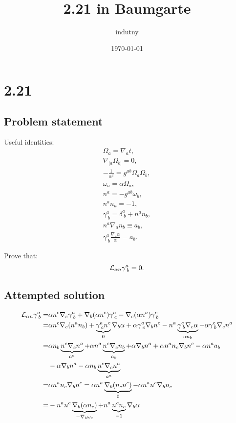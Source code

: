 \documentclass[aps,prd,preprint]{revtex4-1}
\begin{document}
\title{2.21 in Baumgarte}
\author{indutny}
\date{\today}
\noaffiliation

\maketitle

\section{2.21}

\subsection{Problem statement}

Useful identities:
\begin{align}
\Omega_a = \nabla_a t, \\
\nabla_{[a} \Omega_{b]} = 0, \\
-\frac{1}{\alpha^2} = g^{ab} \Omega_a \Omega_b, \\
\omega_a = \alpha \Omega_a, \\
n^a = -g^{ab} \omega_b, \\
n^a n_a = -1, \\
\gamma^a_{\; b} = \delta^a_{\; b} + n^a n_b, \\
n^a \nabla_a n_b \equiv a_b, \\
\gamma^a_{\; b} \frac{\nabla_a \alpha}{\alpha} = a_b.
\end{align}

Prove that:
\begin{align}
{\cal{L}}_{\alpha n} \gamma^a_{\; b} = 0.
\end{align}

\subsection{Attempted solution}

\begin{align}
{\cal{L}}_{\alpha n} \gamma^a_{\; b} = &
  \alpha n^c \nabla_c \gamma^a_{\; b} +
  \nabla_b (\alpha n^c) \gamma^a_{\; c} -
  \nabla_c (\alpha n^a) \gamma^c_{\; b} \\
= & \alpha n^c \nabla_c (n^a n_b) +
  \underbrace{\gamma^a_{\; c} n^c}_{0}  \nabla_b \alpha + \alpha \gamma^a_{\; c} \nabla_b n^c -
  n^a \underbrace{\gamma^c_{\; b} \nabla_c \alpha}_{\alpha a_b} - \alpha \gamma^c_{\; b} \nabla_c n^a \\
= & \alpha n_b \underbrace{n^c \nabla_c n^a}_{a^a} + \alpha n^a \underbrace{n^c \nabla_c n_b}_{a_b} +
  \alpha \nabla_b n^a + \alpha n^a n_c \nabla_b n^c -   \alpha n^a a_b \\
& - \alpha \nabla_b n^a - \alpha n_b \underbrace{n^c \nabla_c n^a}_{a^a} \\
= & \alpha n^a n_c \nabla_b n^c = \alpha n^a \underbrace{ \nabla_b ( n_c n^c ) }_{0} - \alpha n^a n^c \nabla_b n_c \\
= & -n^a n^c \underbrace{\nabla_b (\alpha n_c)}_{-\nabla_b \omega_c} + n^a \underbrace{n^c n_c}_{-1} \nabla_b \alpha
\end{align}
\end{document}
